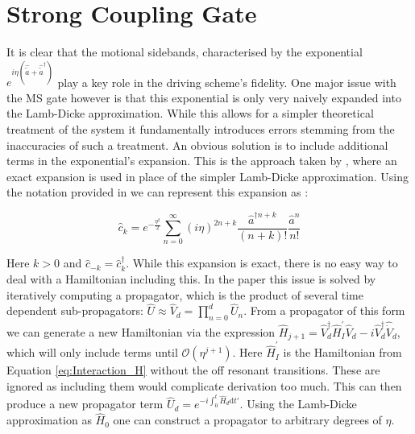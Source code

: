 \documentclass[12pt,twoside]{report}
\begin{document}
\section{Strong Coupling Gate}
\label{Driving_schemes:SC}

It is clear that the motional sidebands, characterised by the exponential ${e^{i\eta\left(\hat{\tilde{a}}+\hat{\tilde{a}}^\dagger\right)}}$ play a key role in the driving scheme's fidelity. One major issue with the MS gate however is that this exponential is only very naively expanded into the Lamb-Dicke approximation\cite{Fast_MS}. While this allows for a simpler theoretical treatment of the system it fundamentally introduces errors stemming from the inaccuracies of such a treatment. An obvious solution is to include additional terms in the exponential's expansion. This is the approach taken by \cite{SC_Paper}, where an exact expansion is used in place of the simpler Lamb-Dicke approximation. Using the notation provided in  we can represent this expansion as \cite{SC_Paper}:

\begin{equation}
	\hat{c}_k = e^{-\frac{\eta^2}{2}}\sum_{n=0}^\infty \left(i\eta\right)^{2n+k}\frac{\hat{a}^{\dagger n+k}}{\left(n+k\right)!}\frac{\hat{a}^{n}}{n!}
	\label{eq:SC_expansion}
\end{equation}

Here $k > 0$ and $\hat{c}_{-k} = \hat{c}_k^\dagger$. While this expansion is exact, there is no easy way to deal with a Hamiltonian including this. In the paper this issue is solved by iteratively computing a propagator, which is the product of several time dependent sub-propagators: $\hat{U} \approx \hat{V}_d = \prod_{n=0}^{d}\hat{U}_n$. From a propagator of this form we can generate a new Hamiltonian via the expression ${\hat{H}_{j+1} = \hat{V}_d^\dagger \hat{H}_I^{'} \hat{V}_d - i\hat{V}_d^\dagger\hat{\dot{V}}_d}$, which will only include terms until $\mathcal{O}\left(\eta^{j+1}\right)$. Here $\hat{H}_I^{'}$ is the Hamiltonian from Equation \eqref{eq:Interaction_H} without the off resonant transitions. These are ignored as including them would complicate derivation too much. This can then produce a new propagator term $\hat{U}_d = e^{-i\int_{0}^{t}\hat{H}_d\text{d}t'}$. Using the Lamb-Dicke approximation as $\hat{H}_0$ one can construct a propagator to arbitrary degrees of $\eta$\cite{SC_Paper}.
\end{document}
